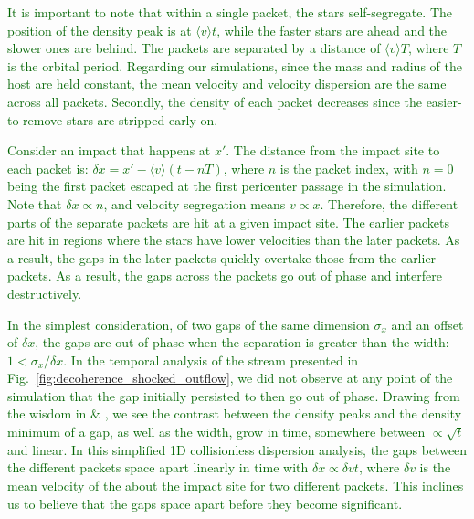 \documentclass{aa}
\newcommand{\salvatore}[1]{\textcolor{darkgreen}{{#1}}}
\begin{document}
\begin{appendix}
\salvatore{It is important to note that within a single packet, the stars self-segregate. The position of the density peak is at $\langle v \rangle t$, while the faster stars are ahead and the slower ones are behind. The packets are separated by a distance of $\langle  v\rangle T$, where $T$ is the orbital period. Regarding our simulations, since the mass and radius of the host are held constant, the mean velocity and velocity dispersion are the same across all packets. Secondly, the density of each packet decreases since the easier-to-remove stars are stripped early on. }

\salvatore{Consider an impact that happens at $x\prime$. The distance from the impact site to each packet is: $\delta x= x\prime - \langle v\rangle \left(t-n T\right)$, where $n$ is the packet index, with $n=0$ being the first packet escaped at the first pericenter passage in the simulation. Note that $\delta x\propto n$, and velocity segregation means $v\propto x$. Therefore, the different parts of the separate packets are hit at a given impact site. The earlier packets are hit in regions where the stars have lower velocities than the later packets. As a result, the gaps in the later packets quickly overtake those from the earlier packets. As a result, the gaps across the packets go out of phase and interfere destructively.}

\salvatore{In the simplest consideration, of two gaps of the same dimension $\sigma_x$ and an offset of $\delta x$, the gaps are out of phase when the separation is greater than the width: $1<\sigma_x/\delta x$. In the temporal analysis of the stream presented in Fig.~\ref{fig:decoherence_shocked_outflow}, we did not observe at any point of the simulation that the gap initially persisted to then go out of phase. Drawing from the wisdom in \citet{2015MNRAS.450.1136E} \& \citet{2016MNRAS.457.3817S}, we see the contrast between the density peaks and the density minimum of a gap, as well as the width, grow in time, somewhere between $\propto \sqrt{t}$ and linear. In this simplified 1D collisionless dispersion analysis, the gaps between the different packets space apart linearly in time with $\delta x\propto \delta vt$, where $\delta v$ is the mean velocity of the about the impact site for two different packets. This inclines us to believe that the gaps space apart before they become significant. }


\end{appendix}
\end{document}
